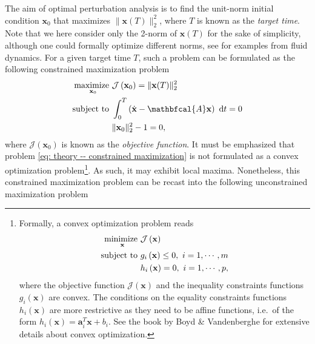       The aim of optimal perturbation analysis is to find the unit-norm initial condition $\mathbf{x}_0$ that maximizes $\| \mathbf{x}(T) \|_2^2$, where $T$ is known as the \emph{target time}. Note that we here consider only the 2-norm of $\mathbf{x}(T)$ for the sake of simplicity, although one could formally optimize different norms, see \cite{??} for examples from fluid dynamics. For a given target time $T$, such a problem can be formulated as the following constrained maximization problem
      \begin{equation}
          \begin{aligned}
            \maximize \limits_{\mathbf{x}_0} & \mathcal{J} \left( \mathbf{x}_0 \right) = \| \mathbf{x}(T) \|_2^2\\
            \subjecto & \int_0^T \left( \dot{\mathbf{x}} - \mathbfcal{A}\mathbf{x} \right) \ \mathrm{d}t = 0 \\
            ~ & \| \mathbf{x}_0 \|_2^2 - 1 = 0,
          \end{aligned}
          \label{eq: theory -- constrained maximization}
      \end{equation}
      where $\mathcal{J}(\mathbf{x}_{0})$ is known as the \emph{objective function}. It must be emphasized that problem \eqref{eq: theory -- constrained maximization} is not formulated as a convex optimization problem\footnote{
      Formally, a convex optimization problem reads
      \begin{equation}
        \begin{aligned}
          \operatorname*{minimize~} \limits_{\mathbf{x}} & \mathcal{J} \left( \mathbf{x} \right) \\
          \operatorname{subject~to~} & g_i \left( \mathbf{x} \right) \leq 0, \ i = 1, \cdots, m \\
          ~ & h_i \left( \mathbf{x} \right) = 0, \ i = 1, \cdots, p,
        \end{aligned}
        \notag
      \end{equation}
      where the objective function $\mathcal{J} \left( \mathbf{x} \right)$ and the inequality constraints functions $g_i \left( \mathbf{x} \right)$ are convex. The conditions on the equality constraints functions $h_i \left( \mathbf{x} \right)$ are more restrictive as they need to be affine functions, i.e.\ of the form $h_i \left( \mathbf{x} \right) = \mathbf{a}_i^T \mathbf{x} + b_i$. See the book by Boyd \& Vandenberghe \cite{book:boyd:2004} for extensive details about convex optimization.}.
      As such, it may exhibit local maxima. Nonetheless, this constrained maximization problem can be recast into the following unconstrained maximization problem
